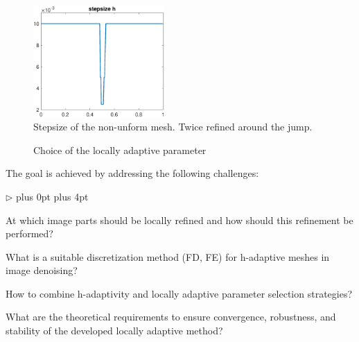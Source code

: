 \documentclass[enabledeprecatedfontcommands,cleardoublepage=empty,headsepline,twoside,11pt,DIV=15,BCOR=12mm,final]{scrartcl}
\renewenvironment{itemize}
{\begin{list}{$\triangleright$}{\labelwidth-2mm \leftmargin3mm %
  \itemsep5pt plus 0pt  \topsep3pt \parsep1pt plus 4pt \labelsep2mm}}
{\end{list}}
\begin{document}
\begin{figure}
\begin{center}
\includegraphics[width=5cm]{stepsize}
\caption{Stepsize of the non-unform mesh. Twice refined around the jump.}\label{fig:stepsize}
\end{center}
\end{figure}
\begin{figure}
\begin{center}
\hspace{0.2cm}
\caption{Choice of the locally adaptive parameter}\label{fig:lamdba}
\end{center}
\end{figure}
The goal is achieved by addressing the following challenges:
\begin{itemize}
\item At which image parts should be locally refined and how should this refinement be performed?
\item What is a suitable discretization method (FD, FE) for h-adaptive meshes in image denoising?
\item How to combine h-adaptivity and locally adaptive parameter selection strategies? 
\item What are the theoretical requirements to ensure convergence, robustness, and stability of the developed locally adaptive method?
\end{itemize}
\end{document}

